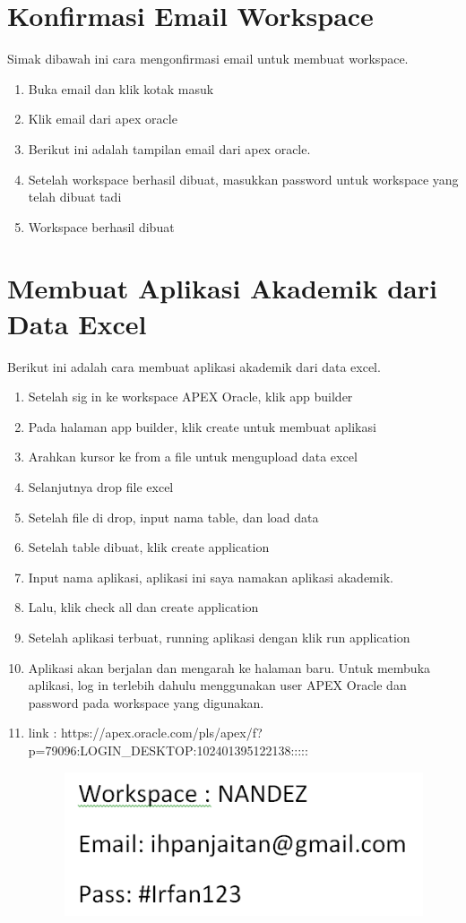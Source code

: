 \section{Konfirmasi Email Workspace}
Simak dibawah ini cara mengonfirmasi email untuk membuat workspace.
\begin{enumerate}
    \item Buka email dan klik kotak masuk
    \item Klik email dari apex oracle
    \item Berikut ini adalah tampilan email dari apex oracle.
    \item Setelah workspace berhasil dibuat, masukkan password untuk workspace yang telah dibuat tadi
    \item Workspace berhasil dibuat
\end{enumerate}

\section{Membuat Aplikasi Akademik dari Data Excel}
Berikut ini adalah cara membuat aplikasi akademik dari data excel.

\begin{enumerate}
    \item Setelah sig in ke workspace APEX Oracle, klik app builder
    \item Pada halaman app builder, klik create untuk membuat aplikasi
    \item Arahkan kursor ke from a file untuk mengupload data excel
    \item Selanjutnya drop file excel
    \item Setelah file di drop, input nama table, dan load data
    \item Setelah table dibuat, klik create application
    \item Input nama aplikasi, aplikasi ini saya namakan aplikasi akademik.
    \item Lalu, klik check all dan create application
    \item Setelah aplikasi terbuat, running aplikasi dengan klik run application
    \item Aplikasi akan berjalan dan mengarah ke halaman baru. Untuk membuka aplikasi, log in terlebih dahulu menggunakan user APEX Oracle dan password pada workspace yang digunakan.
    \item link : https://apex.oracle.com/pls/apex/f?p=79096:LOGIN\_DESKTOP:102401395122138:::::
\begin{figure}[!htbp]
    \centering
    \includegraphics[scale=1]{gambar/2.png}
    \label{penanda}
\end{figure}
\end{enumerate}